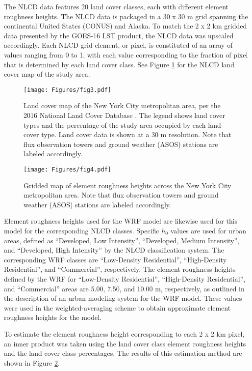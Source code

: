 The NLCD data features 20 land cover classes, each with different element roughness heights. The NLCD data is packaged in a 30 x 30 m grid spanning the continental United States (CONUS) and Alaska. To match the 2 x 2 km gridded data presented by the GOES-16 LST product, the NLCD data was upscaled accordingly. Each NLCD grid element, or pixel, is constituted of an array of values ranging from 0 to 1, with each value corresponding to the fraction of pixel that is determined by each land cover class. See Figure \ref{fig:land_cover_map} for the NLCD land cover map of the study area.

\begin{figure}[!h]
    \centering
      \texttt{[image: Figures/fig3.pdf]}
      \caption{Land cover map of the New York City metropolitan area, per the 2016 National Land Cover Database \citep{Yang_2018}. The legend shows land cover types and the percentage of the study area occupied by each land cover type. Land cover data is shown at a 30 m resolution. Note that flux observation towers and ground weather (ASOS) stations are labeled accordingly.}
      \label{fig:land_cover_map}
\end{figure}

\begin{figure}[!h]
    \centering
      \texttt{[image: Figures/fig4.pdf]}
      \caption{Gridded map of element roughness heights across the New York City metropolitan area.  Note that flux observation towers and ground weather (ASOS) stations are labeled accordingly.}
      \label{fig:roughness_height_map}
\end{figure}

Element roughness heights used for the WRF model are likewise used for this model for the corresponding NLCD classes. Specific $h_0$ values are used for urban areas, defined as “Developed, Low Intensity”, “Developed, Medium Intensity”, and “Developed, High Intensity” by the NLCD classification system. The corresponding WRF classes are “Low-Density Residential”, “High-Density Residential”, and “Commercial”, respectively. The element roughness heights defined by the WRF for “Low-Density Residential”, “High-Density Residential”,  and “Commercial” areas are 5.00, 7.50, and 10.00 m, respectively, as outlined in the description of an urban modeling system for the WRF model. These values were used in the weighted-averaging scheme to obtain approximate element roughness heights for the model.

To estimate the element roughness height corresponding to each 2 x 2 km pixel, an inner product was taken using the land cover class element roughness heights and the land cover class percentages.  The results of this estimation method are shown in Figure \ref{fig:roughness_height_map}.

